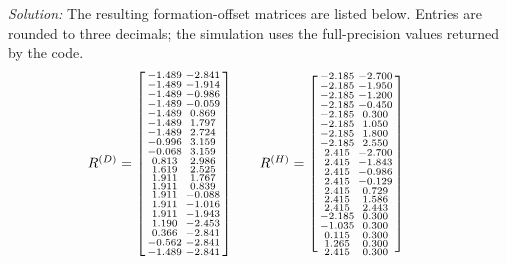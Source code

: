 \documentclass[a4paper,11pt]{article}
\newenvironment{solution}{\textit{Solution:}}{}
\begin{document}
\begin{solution}
The resulting formation-offset matrices are listed below. Entries are rounded to three decimals;
the simulation uses the full-precision values returned by the code.
\[
\begin{array}{c@{\qquad}c@{\qquad}c}
R^{(D)}=\left[\begin{smallmatrix}
-1.489&-2.841\\-1.489&-1.914\\-1.489&-0.986\\-1.489&-0.059\\-1.489&0.869\\
-1.489&1.797\\-1.489&2.724\\-0.996&3.159\\-0.068&3.159\\0.813&2.986\\
1.619&2.525\\1.911&1.767\\1.911&0.839\\1.911&-0.088\\1.911&-1.016\\
1.911&-1.943\\1.190&-2.453\\0.366&-2.841\\-0.562&-2.841\\-1.489&-2.841
\end{smallmatrix}\right]&
R^{(H)}=\left[\begin{smallmatrix}
-2.185&-2.700\\-2.185&-1.950\\-2.185&-1.200\\-2.185&-0.450\\-2.185&0.300\\
-2.185&1.050\\-2.185&1.800\\-2.185&2.550\\2.415&-2.700\\2.415&-1.843\\
2.415&-0.986\\2.415&-0.129\\2.415&0.729\\2.415&1.586\\2.415&2.443\\
-2.185&0.300\\-1.035&0.300\\0.115&0.300\\1.265&0.300\\2.415&0.300
\end{smallmatrix}\right]&

\end{array}\]
\end{solution}
\end{document}
